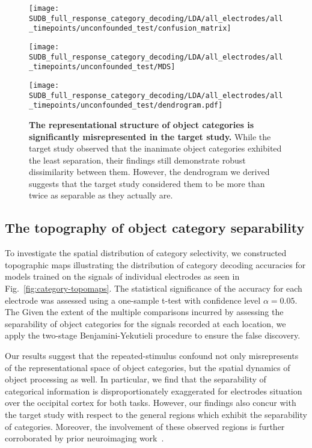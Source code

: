 \begin{figure}
    \begin{minipage}[b]{0.32\columnwidth} 
        \texttt{[image: SUDB\_full\_response\_category\_decoding/LDA/all\_electrodes/all\_timepoints/unconfounded\_test/confusion\_matrix]}
    \end{minipage}
    \begin{minipage}[b]{0.32\columnwidth}
        \texttt{[image: SUDB\_full\_response\_category\_decoding/LDA/all\_electrodes/all\_timepoints/unconfounded\_test/MDS]}
    \end{minipage}
    \begin{minipage}[b]{0.32\columnwidth}
        \texttt{[image: SUDB\_full\_response\_category\_decoding/LDA/all\_electrodes/all\_timepoints/unconfounded\_test/dendrogram.pdf]}
    \end{minipage}
    \caption{\textbf{The representational structure of object categories is significantly misrepresented in the target study.} While the target study observed that the inanimate object categories exhibited the least separation, their findings still demonstrate robust dissimilarity between them. However, the dendrogram we derived suggests that the target study considered them to be more than twice as separable as they actually are. \label{fig:category-representation}}
\end{figure}


\subsection{The topography of object category separability}
To investigate the spatial distribution of category selectivity, we constructed topographic maps illustrating the distribution of category decoding accuracies for models trained on the signals of individual electrodes as seen in Fig.~\ref{fig:category-topomaps}. The statistical significance of the accuracy for each electrode was assessed using a one-sample t-test with confidence level \(\alpha=0.05\). The  Given the extent of the multiple comparisons incurred by assessing the separability of object categories for the signals recorded at each location, we apply the two-stage Benjamini-Yekutieli procedure to ensure the false discovery.

Our results suggest that the repeated-stimulus confound not only misrepresents of the representational space of object categories, but the spatial dynamics of object processing as well. In particular, we find that the separability of categorical information is disproportionately exaggerated for electrodes situation over the occipital cortex for both tasks. However, our findings also concur with the target study with respect to the general regions which exhibit the separability of categories. Moreover, the involvement of these observed regions is further corroborated by prior neuroimaging work~\cite{Itier:2004}.

